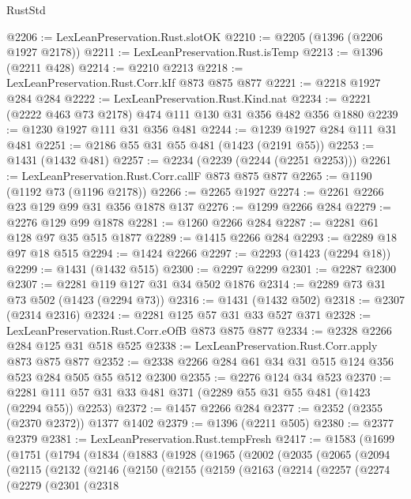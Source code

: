 \begin{lexlean}{RustStd}
\begin{coremodule}
{\begin{coremodule}
{{{{{{{{{@2206 := LexLeanPreservation.Rust.slotOK
@2210 := @2205 (@1396 (@2206 @1927 @2178))
@2211 := LexLeanPreservation.Rust.isTemp
@2213 := @1396 (@2211 @428)
@2214 := @2210 @2213
@2218 := LexLeanPreservation.Rust.Corr.kIf @873 @875 @877
@2221 := @2218 @1927 @284 @284
@2222 := LexLeanPreservation.Rust.Kind.nat
@2234 := @2221 (@2222 @463 @73 @2178) @474 @111 @130 @31 @356 @482 @356 @1880
@2239 := @1230 @1927 @111 @31 @356 @481
@2244 := @1239 @1927 @284 @111 @31 @481
@2251 := @2186 @55 @31 @55 @481 (@1423 (@2191 @55))
@2253 := @1431 (@1432 @481)
@2257 := @2234 (@2239 (@2244 (@2251 @2253)))
@2261 := LexLeanPreservation.Rust.Corr.callF @873 @875 @877
@2265 := @1190 (@1192 @73 (@1196 @2178))
@2266 := @2265 @1927
@2274 := @2261 @2266 @23 @129 @99 @31 @356 @1878 @137
@2276 := @1299 @2266 @284
@2279 := @2276 @129 @99 @1878
@2281 := @1260 @2266 @284
@2287 := @2281 @61 @128 @97 @35 @515 @1877
@2289 := @1415 @2266 @284
@2293 := @2289 @18 @97 @18 @515
@2294 := @1424 @2266
@2297 := @2293 (@1423 (@2294 @18))
@2299 := @1431 (@1432 @515)
@2300 := @2297 @2299
@2301 := @2287 @2300
@2307 := @2281 @119 @127 @31 @34 @502 @1876
@2314 := @2289 @73 @31 @73 @502 (@1423 (@2294 @73))
@2316 := @1431 (@1432 @502)
@2318 := @2307 (@2314 @2316)
@2324 := @2281 @125 @57 @31 @33 @527 @371
@2328 := LexLeanPreservation.Rust.Corr.eOfB @873 @875 @877
@2334 := @2328 @2266 @284 @125 @31 @518 @525
@2338 := LexLeanPreservation.Rust.Corr.apply @873 @875 @877
@2352 := @2338 @2266 @284 @61 @34 @31 @515 @124 @356 @523 @284 @505 @55 @512 @2300
@2355 := @2276 @124 @34 @523
@2370 := @2281 @111 @57 @31 @33 @481 @371 (@2289 @55 @31 @55 @481 (@1423 (@2294 @55)) @2253)
@2372 := @1457 @2266 @284
@2377 := @2352 (@2355 (@2370 @2372)) @1377 @1402
@2379 := @1396 (@2211 @505)
@2380 := @2377 @2379
@2381 := LexLeanPreservation.Rust.tempFresh
@2417 := @1583
    (@1699
      (@1751
        (@1794
          (@1834
            (@1883
              (@1928
                (@1965
                  (@2002
                    (@2035
                      (@2065
                        (@2094
                          (@2115
                            (@2132
                              (@2146
                                (@2150
                                  (@2155
                                    (@2159
                                      (@2163
                                        (@2214
                                          (@2257
                                            (@2274
                                              (@2279
                                                (@2301
                                                  (@2318
}}}}}}}}}
\end{coremodule}}
\end{coremodule}
\end{lexlean}
